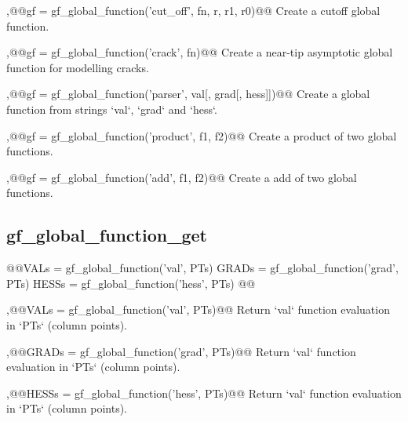 \begin{cmddescription}
  \sep{@@\tgl gf = gf_global_function('cut_off', \tint fn, \tscal r, \tscal r1, \tscal r0)@@}
  Create a cutoff global function.

  \sep{@@\tgl gf = gf_global_function('crack', \tint fn)@@}
  Create a near-tip asymptotic global function for modelling cracks.  

  \sep{@@\tgl gf = gf_global_function('parser', \tstr val[, \tstr grad[, \tstr hess]])@@}
  Create a global function from strings `val`, `grad` and `hess`.

  \sep{@@\tgl gf = gf_global_function('product', \tgl f1, \tgl f2)@@}
  Create a product of two global functions.

  \sep{@@\tgl gf = gf_global_function('add', \tgl f1, \tgl f2)@@}
  Create a add of two global functions.

\end{cmddescription}
\newpage


\subsection{gf\_global_function_get}
\begin{synopsis}
@@\tmat VALs = gf_global_function('val', \tmat PTs)
  \tmat GRADs = gf_global_function('grad', \tmat PTs)
  \tmat HESSs = gf_global_function('hess', \tmat PTs)
@@\end{synopsis}
\begin{cmddescription}
  \sep{@@\tmat VALs = gf_global_function('val', \tmat PTs)@@}
  Return `val` function evaluation in `PTs` (column points).

  \sep{@@\tmat GRADs = gf_global_function('grad', \tmat PTs)@@}
  Return `val` function evaluation in `PTs` (column points).

  \sep{@@\tmat HESSs = gf_global_function('hess', \tmat PTs)@@}
  Return `val` function evaluation in `PTs` (column points).
  
\end{cmddescription}
\newpage



